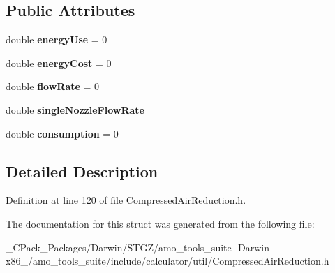\subsection*{Public Attributes}
\begin{DoxyCompactItemize}
\item 
\mbox{\label{struct_compressed_air_reduction_1_1_output_ac223071527457cb152e19c7d3d0a9837}} 
double {\bfseries energy\+Use} = 0
\item 
\mbox{\label{struct_compressed_air_reduction_1_1_output_a876379df6466bff2bc52284d0dea0033}} 
double {\bfseries energy\+Cost} = 0
\item 
\mbox{\label{struct_compressed_air_reduction_1_1_output_a641a75e826bb46dd0f13fdde29624e87}} 
double {\bfseries flow\+Rate} = 0
\item 
\mbox{\label{struct_compressed_air_reduction_1_1_output_a5f613bc9d99fa1140491d64364a54d6a}} 
double {\bfseries single\+Nozzle\+Flow\+Rate}
\item 
\mbox{\label{struct_compressed_air_reduction_1_1_output_ae886ab97b0aab6d8ce0e005759fe9275}} 
double {\bfseries consumption} = 0
\end{DoxyCompactItemize}


\subsection{Detailed Description}


Definition at line 120 of file Compressed\+Air\+Reduction.\+h.



The documentation for this struct was generated from the following file\+:\begin{DoxyCompactItemize}
\item 
\+\_\+\+C\+Pack\+\_\+\+Packages/\+Darwin/\+S\+T\+G\+Z/amo\+\_\+tools\+\_\+suite-\/-\/\+Darwin-\/x86\+\_/amo\+\_\+tools\+\_\+suite/include/calculator/util/Compressed\+Air\+Reduction.\+h\end{DoxyCompactItemize}

